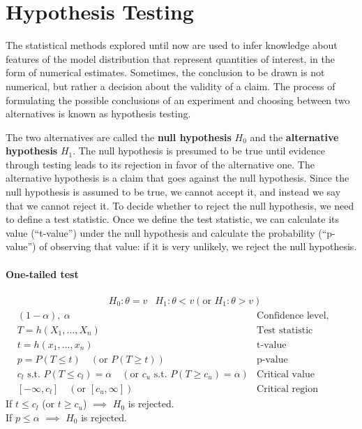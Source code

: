 \section{Hypothesis Testing}

The statistical methods explored until now are used to infer knowledge about features of the model distribution that represent quantities of interest, in the form of numerical estimates. Sometimes, the conclusion to be drawn is not numerical, but rather a decision about the validity of a claim.  The process of formulating the possible conclusions of an experiment and choosing between two alternatives is known as hypothesis testing.

The two alternatives are called the \textbf{null hypothesis} $H_0$ and the \textbf{alternative hypothesis} $H_1$. The null hypothesis is presumed to be true until evidence through testing leads to its rejection in favor of the alternative one. The alternative hypothesis is a claim that goes against the null hypothesis. Since the null hypothesis is assumed to be true, we cannot accept it, and instead we say that we cannot reject it. To decide whether to reject the null hypothesis, we need to define a test statistic.
Once we define the test statistic, we can calculate its value (``t-value'') under the null hypothesis and calculate the probability (``p-value'') of observing that value: if it is very unlikely, we reject the null hypothesis.

\paragraph{One-tailed test}
\begin{align*}
    &H_0 : \theta = v &H_1 : \theta < v (\text{or } H_1 : \theta > v)
\end{align*}
\begin{align*}
    &(1-\alpha),\ \alpha &\text{Confidence level, significance level}\\
    &T = h(X_1, \ldots, X_n) &\text{Test statistic}\\
    &t = h(x_1, \ldots, x_n) &\text{t-value}\\
    &p = P(T \leq t) \quad (\text{or } P(T \geq t)) &\text{p-value}\\
    &c_l \text{ s.t. } P(T \leq c_l) = \alpha \quad (\text{or } c_u \text{ s.t. } P(T \geq c_u) = \alpha) &\text{Critical value} \\
    &[-\infty, c_l] \quad (\text{or } [c_u, \infty]) &\text{Critical region}
\end{align*}
If $t \leq c_l$ (or $t \geq c_u$) $\implies$ $H_0$ is rejected. \\
If $p \leq \alpha$ $\implies$ $H_0$ is rejected. \\

